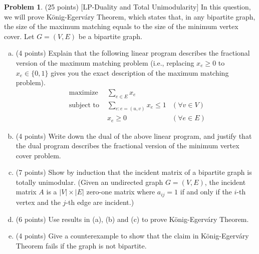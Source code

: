 \documentclass{article}
\theoremstyle{definition}
\newtheorem{prob}{Problem}
\begin{document}
	\begin{prob}
		(25 points) [LP-Duality and Total Unimodularity] In this question, we will prove König-Egerváry Theorem, which states that, in any bipartite graph, the size of the maximum matching equals to the size of the minimum vertex cover. Let $G=(V, E)$ be a bipartite graph.
		
		\begin{enumerate}[(a)]
			\item (4 points) Explain that the following linear program describes the fractional version of the maximum matching problem (i.e., replacing $x_{e} \geq 0$ to $x_{e} \in\{0,1\}$ gives you the exact description of the maximum matching problem).
			$$
			\begin{aligned}
				\text { maximize } & \sum_{e \in E} x_{e} \\
				\text { subject to } & \sum_{e: e=(u, v)} x_{e} \leq 1 & (\forall v \in V) \\
				& x_{e} \geq 0 & (\forall e \in E)
			\end{aligned}
			$$
			\item (4 points) Write down the dual of the above linear program, and justify that the dual program describes the fractional version of the minimum vertex cover problem.
			\item (7 points) Show by induction that the incident matrix of a bipartite graph is totally unimodular. (Given an undirected graph $G=(V, E)$, the incident matrix $A$ is a $|V| \times|E|$ zero-one matrix where $a_{i j}=1$ if and only if the $i$-th vertex and the $j$-th edge are incident.)
			\item (6 points) Use results in (a), (b) and (c) to prove König-Egerváry Theorem.
			\item (4 points) Give a counterexample to show that the claim in König-Egerváry Theorem fails if the graph is not bipartite. 
		\end{enumerate}
	\end{prob}
\end{document}
